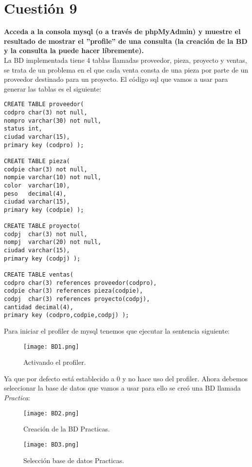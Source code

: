 \documentclass[a4paper, 11pt]{article} %
\begin{document}
\pagebreak

\section{Cuestión 9}
\textbf{Acceda a la consola mysql (o a través de phpMyAdmin) y muestre el resultado de mostrar el ”profile” de una consulta (la creación de la BD y la consulta la puede hacer líbremente).}\\

\cite{20} \cite{21} La BD implementada tiene 4 tablas llamadas proveedor, pieza, proyecto y ventas, se trata de un problema en el que cada venta consta de una pieza por parte de un proveedor destinado para un proyecto. El código sql que vamos a usar para generar las tablas es el siguiente:

\begin{verbatim}
CREATE TABLE proveedor(
codpro char(3) not null,
nompro varchar(30) not null,
status int,
ciudad varchar(15),
primary key (codpro) );

CREATE TABLE pieza(
codpie char(3) not null,
nompie varchar(10) not null,
color  varchar(10),
peso   decimal(4),
ciudad varchar(15),
primary key (codpie) );

CREATE TABLE proyecto(
codpj  char(3) not null,
nompj  varchar(20) not null,
ciudad varchar(15),
primary key (codpj) );

CREATE TABLE ventas(
codpro char(3) references proveedor(codpro),
codpie char(3) references pieza(codpie),
codpj  char(3) references proyecto(codpj),
cantidad decimal(4),
primary key (codpro,codpie,codpj) );
\end{verbatim}

\pagebreak

Para iniciar el profiler de mysql tenemos que ejecutar la sentencia siguiente:
\begin{figure}[H]
\centering 
\texttt{[image: BD1.png]} 
\caption{Activando el profiler.} 
\label{contexto:figura} 
\end{figure}

Ya que por defecto está establecido a 0 y no hace uso del profiler. Ahora debemos seleccionar la base de datos que vamos a usar para ello se creó una BD llamada \textit{Practica}:
\begin{figure}[H]
\centering 
\texttt{[image: BD2.png]} 
\caption{Creación de la BD Practicas.} 
\label{contexto:figura} 
\end{figure}

\begin{figure}[H]
\centering 
\texttt{[image: BD3.png]} 
\caption{Selección base de datos Practicas.} 
\label{contexto:figura} 
\end{figure}
\end{document}
